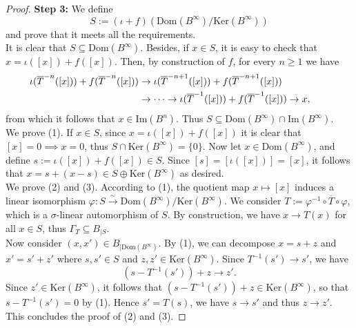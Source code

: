 \documentclass[12pt]{amsart}
\theoremstyle{definition}
\newcommand{\<}{\langle}   %
\renewcommand{\>}{\rangle} %
\begin{document}
\begin{proof}
\textbf{Step 3:} We define 
\[ S := (\iota+f)(\mathrm{Dom}(B^{\infty})/\mathrm{Ker}(B^{\infty})) \] 
and prove that it meets all the requirements.\\
It is clear that $S \subseteq  \mathrm{Dom}(B^{\infty})$. Besides, if $x \in S$, it is easy to check that $x = \iota([x]) + f([x])$. Then, by construction of $f$, for every $n\geq 1$ we have 
\begin{equation*}
   \hspace*{-2em} 
   \begin{split}
       \iota(\overline T^{-n}([x])) + f(\overline T^{-n}([x])) & \to \iota(\overline T^{-n+1}([x])) + f(\overline T^{-n+1}([x])) 
       \\ 
       & \to \cdots \to \iota(\overline T^{-1}([x])) + f(\overline T^{-1}([x])) \to x,
   \end{split}
\end{equation*}
from which it follows that $x \in \mathrm{Im}(B^n)$. Thus $S \subseteq  \mathrm{Dom}(B^{\infty}) \cap \mathrm{Im}(B^{\infty})$.\\
We prove (1). If $x \in S$, since $x = \iota([x]) + f([x])$ it is clear that $[x] = 0 \implies x = 0$, thus $S \cap \mathrm{Ker}(B^{\infty}) = \{0\}$. Now let $x \in \mathrm{Dom}(B^{\infty})$, and define $s := \iota([x]) + f([x]) \in S$. Since $[s] = [\iota([x])] = [x]$, it follows that $x = s + (x-s) \in S \oplus \mathrm{Ker}(B^{\infty})$ as desired.\\
We prove (2) and (3). According to (1), the quotient map $x\mapsto [x]$ induces a linear isomorphism $\varphi: S \xrightarrow{\sim} \mathrm{Dom}(B^{\infty})/\mathrm{Ker}(B^{\infty})$. We consider $T := \varphi^{-1}\circ\overline T \circ \varphi$, which is a $\sigma$-linear automorphism of $S$. By construction, we have $x \to T(x)$ for all $x \in S$, thus $\Gamma_T \subseteq  B_{|S}$.\\
Now consider $(x,x') \in B_{|\mathrm{Dom}(B^{\infty})}$. By (1), we can decompose $x = s + z$ and $x' = s'+z'$ where $s,s' \in S$ and $z,z' \in \mathrm{Ker}(B^{\infty})$. Since $T^{-1}(s') \to s'$, we have 
\begin{equation*}
    (s-T^{-1}(s'))+z \to z'.
\end{equation*}
Since $z' \in \mathrm{Ker}(B^{\infty})$, it follows that $(s-T^{-1}(s'))+z \in \mathrm{Ker}(B^{\infty})$, so that $s-T^{-1}(s') = 0$ by (1). Hence $s' = T(s)$, we have $s \to s'$ and thus $z \to z'$. This concludes the proof of (2) and (3).
\end{proof}
\end{document}
